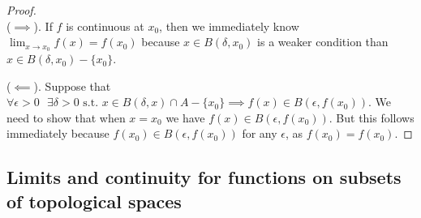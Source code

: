 \begin{proof}
    \mbox{} \\
    \indent ($\implies$). If $f$ is continuous at $x_0$, then we immediately know $\lim_{x \rightarrow x_0} f(x) = f(x_0)$ because $x \in B(\delta, x_0)$ is a weaker condition than $x \in B(\delta, x_0) - \{x_0\}$. 
    
    ($\impliedby$). Suppose that $\forall \epsilon > 0 \text{ } \exists \delta > 0 \text{ s.t. } x \in B(\delta, x) \cap A - \{x_0\} \implies f(x) \in B(\epsilon, f(x_0))$. We need to show that when $x = x_0$ we have $f(x) \in B(\epsilon, f(x_0))$. But this follows immediately because $f(x_0) \in B(\epsilon, f(x_0))$ for any $\epsilon$, as $f(x_0) = f(x_0)$.
    
    
    
    
\end{proof}

\subsection*{Limits and continuity for functions on subsets of topological spaces}

    
    
    
